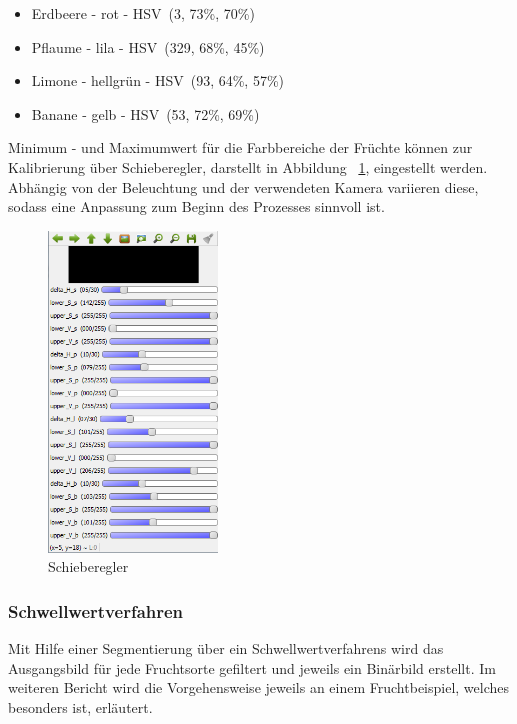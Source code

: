 \begin{itemize}
    \item Erdbeere - rot - HSV~(3, 73\%, 70\%)
    \item Pflaume - lila - HSV~(329, 68\%, 45\%)
    \item Limone - hellgrün - HSV~(93, 64\%, 57\%)
    \item Banane - gelb - HSV~(53, 72\%, 69\%)
\end{itemize}

Minimum - und Maximumwert für die Farbbereiche der Früchte können zur Kalibrierung über Schieberegler, darstellt in Abbildung ~\ref{fig:Regler}, eingestellt werden. Abhängig von der Beleuchtung und der verwendeten Kamera variieren diese, sodass eine Anpassung zum Beginn des Prozesses sinnvoll ist. 

\begin{figure}[H]
    \centering
    \includegraphics[width=0.4\textwidth]{Abbildungen/Regler02}
    \caption[Regler]{Schieberegler}
    \label{fig:Regler}
\end{figure}

\subsubsection{Schwellwertverfahren}

Mit Hilfe einer Segmentierung über ein Schwellwertverfahrens wird das Ausgangsbild für jede Fruchtsorte gefiltert und jeweils ein Binärbild erstellt. Im weiteren Bericht wird die Vorgehensweise jeweils an einem Fruchtbeispiel, welches besonders ist, erläutert. 

